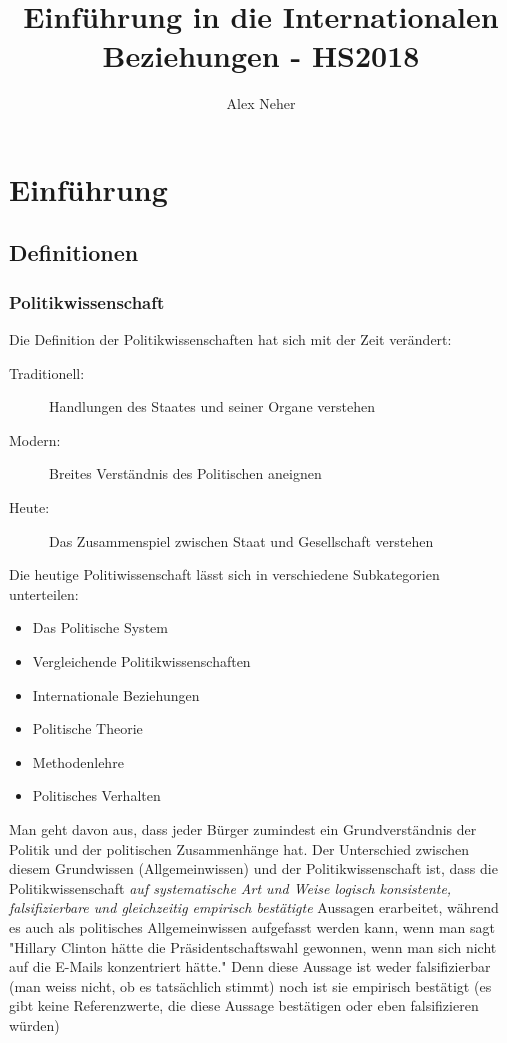 \documentclass[a4paper, 11pt]{article}
\begin{document}
 
\title{Einführung in die Internationalen Beziehungen - HS2018}
\author{Alex Neher}
\maketitle

\tableofcontents
\newpage
\listoffigures
\newpage

\graphicspath{{./Pictures/}}


\section{Einführung}
\subsection{Definitionen}
\subsubsection{Politikwissenschaft}
Die Definition der Politikwissenschaften hat sich mit der Zeit verändert:
\begin{description}
    \item[Traditionell:] Handlungen des Staates und seiner Organe verstehen
    \item[Modern:] Breites Verständnis des Politischen aneignen
    \item[Heute:] Das Zusammenspiel zwischen Staat und Gesellschaft verstehen
\end{description}        

\vspace{10px}
\noindent Die heutige Politiwissenschaft lässt sich in verschiedene Subkategorien unterteilen:
\begin{multicols}{2}
    \begin{itemize}
        \item Das Politische System
        \item Vergleichende Politikwissenschaften
        \item Internationale Beziehungen
\columnbreak
        \item Politische Theorie
        \item Methodenlehre
        \item Politisches Verhalten
    \end{itemize}
\end{multicols}

Man geht davon aus, dass jeder Bürger zumindest ein Grundverständnis der Politik und der politischen Zusammenhänge hat. Der Unterschied zwischen diesem Grundwissen (Allgemeinwissen) und der Politikwissenschaft ist, dass die Politikwissenschaft \textit{auf systematische Art und Weise logisch konsistente, falsifizierbare und gleichzeitig empirisch bestätigte} Aussagen erarbeitet, während es auch als politisches Allgemeinwissen aufgefasst werden kann, wenn man sagt "Hillary Clinton hätte die Präsidentschaftswahl gewonnen, wenn man sich nicht auf die E-Mails konzentriert hätte." Denn diese Aussage ist weder falsifizierbar (man weiss nicht, ob es tatsächlich stimmt) noch ist sie empirisch bestätigt (es gibt keine Referenzwerte, die diese Aussage bestätigen oder eben falsifizieren würden)
\end{document}
